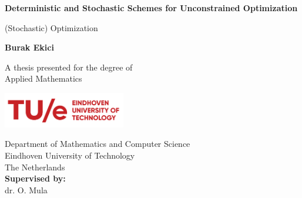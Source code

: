 \begin{titlepage}
    \begin{center}
        \vspace*{1cm}

        \Huge
        \textbf{Deterministic and Stochastic Schemes for Unconstrained Optimization}
        

        \vspace{0.5cm}
        \LARGE
        (Stochastic) Optimization

        \vspace{1.5cm}

        \textbf{Burak Ekici}

        \vfill

        A thesis presented for the degree of\\
        Applied Mathematics
        \vspace{0.5cm}
        
        

        

        \vspace{0.8cm}
        

        \includegraphics[width=0.4\textwidth]{logobetter.png}

        \Large
        Department of Mathematics and Computer Science\\
        Eindhoven University of Technology\\
        The Netherlands\\
        \vspace*{1cm}
        \large
        \textbf{Supervised by:}
        \\[0.1cm]
        dr. O. Mula

    \end{center}
\end{titlepage}